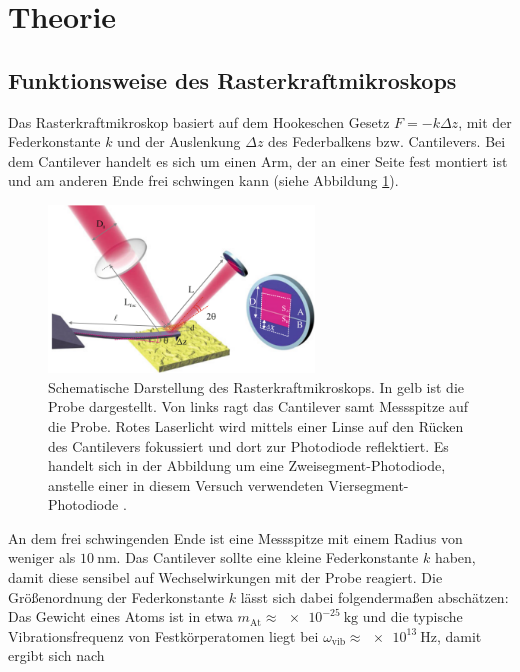 \section{Theorie}
\label{sec:Theorie}

\subsection{Funktionsweise des Rasterkraftmikroskops}
\label{sec:Rasterkraftmikroskop}

Das Rasterkraftmikroskop basiert auf dem Hookeschen Gesetz $F= -k\Delta z$, mit
der Federkonstante $k$ und der Auslenkung $\Delta z$ des Federbalkens bzw. Cantilevers.
Bei dem Cantilever handelt es sich um einen Arm, der an einer Seite fest montiert
ist und am anderen Ende frei schwingen kann (siehe Abbildung \ref{fig:AFM}).

\begin{figure}[H]
	\centering
	\includegraphics[width=0.63\textwidth]{Abb/AFM.png}
	\caption{Schematische Darstellung des Rasterkraftmikroskops. In gelb ist die
  Probe dargestellt. Von links ragt das Cantilever samt Messspitze auf die Probe.
  Rotes Laserlicht wird mittels einer Linse auf den Rücken des Cantilevers
  fokussiert und dort zur Photodiode reflektiert. Es handelt sich in der Abbildung
  um eine Zweisegment-Photodiode, anstelle einer in diesem Versuch verwendeten
  Viersegment-Photodiode \cite[161]{AFM}.}
	\label{fig:AFM}
\end{figure}

\noindent
An dem frei schwingenden Ende ist eine Messspitze mit einem Radius von weniger
als $\SI{10}{\nano\meter}$. Das Cantilever sollte eine kleine Federkonstante $k$ haben,
damit diese sensibel auf Wechselwirkungen mit der Probe reagiert. Die Größenordnung
der Federkonstante $k$ lässt sich dabei folgendermaßen abschätzen: Das Gewicht
eines Atoms ist in etwa $m_{\text{At}} \approx \SI{e-25}{\kilo\gram}$ und
die typische Vibrationsfrequenz von Festkörperatomen liegt bei $\omega_{\text{vib}}
\approx\SI{e13}{\hertz}$, damit ergibt sich nach

